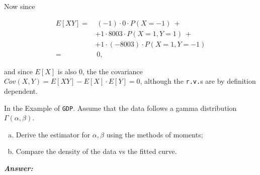 \documentclass[12pt]{article}
\newenvironment{question}[2][Question]{\begin{trivlist}
\item[\hskip \labelsep {\bfseries #1}\hskip \labelsep {\bfseries #2.}]}{\end{trivlist}}
\begin{document}
Now since

\begin{align*}
E[XY] = & \  (-1) \cdot 0 \cdot P(X = - 1)  \ + \\
&+1 \cdot 8003 \cdot P(X = 1, Y = 1) \ + \\
& +1 \cdot (-8003) \cdot P(X = 1, Y = -1)  \\
=& \ 0,
\end{align*}

and since $E[X]$ is also $0$, the
the covariance $Cov(X, Y) = E[XY] - E[X] \cdot E[Y] = 0$, although the \texttt{r.v.}s are by definition dependent.

\bigskip
\bigskip

\begin{question}{3.3}

In the Example of \texttt{GDP}. Assume that the data follows a gamma distribution $\Gamma(\alpha, \beta)$.

\begin{enumerate}[(a)]
\item Derive the estimator for $\alpha, \beta$ using the methods of moments;
\item Compare the density of the data vs the fitted curve.
\end{enumerate}

\end{question}

 \textbf{\color{TealBlue}\emph{Answer:} } 
\end{document}
